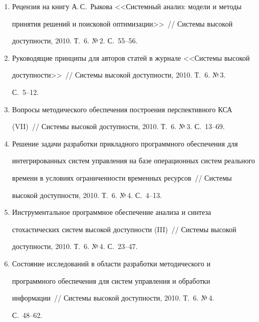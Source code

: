 \begin{enumerate}[1.]
\item {}


Рецензия на книгу А.\,С.~Рыкова <<Системный анализ: модели и методы 


принятия решений и поисковой оптимизации>>~/\!\!/  Сис\-те\-мы высокой 


доступности, 2010. Т.~6. №\,2. С.~55--56.


\item {}


Руководящие принципы для авторов статей в журнале <<Сис\-те\-мы высокой 


доступности>>~/\!\!/  Сис\-те\-мы высокой доступности, 2010. Т.~6. №\,3. 


С.~5--12.


\item {}


Вопросы методического обеспечения построения перспективного КСА 


(VII)~/\!\!/  Сис\-те\-мы высокой доступности, 2010. Т.~6. №\,3. С.~13--69.


\item {}


Решение задачи разработки прикладного программного обеспечения для 


интегрированных сис\-тем управления на базе операционных сис\-тем реального 


времени в условиях ограниченности временных ресурсов~/\!\!/  Сис\-те\-мы 


высокой доступности, 2010. Т.~6. №\,4. С.~4--13.


\item {}


Инструментальное программное обеспечение анализа и синтеза 


стохастических сис\-тем высокой доступности (III)~/\!\!/  Сис\-те\-мы высокой 


доступности, 2010. Т.~6. №\,4. С.~23--47.


\item {}


Состояние исследований в области разработки методического и 


программного обеспечения для сис\-тем управления и обработки 


информации~/\!\!/  Сис\-те\-мы высокой доступности, 2010. Т.~6. №\,4. 


С.~48--62.


  \end{enumerate}


